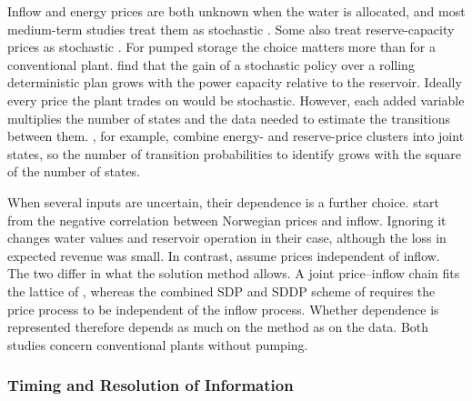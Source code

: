 Inflow and energy prices are both unknown when the water is allocated, and
most medium-term studies treat them as stochastic
\citep{lohndorf2013,helseth2016,kleiven2023,alic2023optimal,bore2026assessing}.
Some also treat reserve-capacity prices as stochastic
\citep{helseth2016,helseth2017iet}.
For pumped storage the choice matters more than for a conventional plant.
\citet{lohndorf2013} find that the gain of a stochastic policy over a
rolling deterministic plan grows with the power capacity relative to the
reservoir.
Ideally every price the plant trades on would be stochastic. However, each
added variable multiplies the number of states and the data needed to
estimate the transitions between them. \citet{helseth2016}, for example,
combine energy- and reserve-price clusters into joint states, so the number
of transition probabilities to identify grows with the square of the number
of states.

When several inputs are uncertain, their dependence is a further choice.
\citet{kleiven2023} start from the negative correlation between Norwegian
prices and inflow. Ignoring it changes water values and reservoir operation
in their case, although the loss in expected revenue was small.
In contrast, \citet{helseth2016} assume prices independent of inflow. The
two differ in what the solution method allows. A joint price--inflow chain
fits the lattice of \citet{kleiven2023}, whereas the combined SDP and SDDP
scheme of \citet{helseth2016} requires the price process to be independent
of the inflow process.
Whether dependence is represented therefore depends as much on the method
as on the data. Both studies concern conventional plants without pumping.

\subsubsection{Timing and Resolution of Information}
\label{sec:lit_unc_timing}

